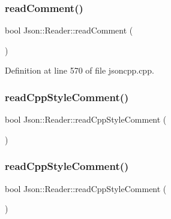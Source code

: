 \hypertarget{class_json_1_1_reader_ad2690e860a1b3332c5401fb0850ba065}{}\label{class_json_1_1_reader_ad2690e860a1b3332c5401fb0850ba065} 
\subsubsection{\texorpdfstring{read\+Comment()}{readComment()}\hspace{0.1cm}{\footnotesize\ttfamily [2/2]}}
{\footnotesize\ttfamily bool Json\+::\+Reader\+::read\+Comment (\begin{DoxyParamCaption}{ }\end{DoxyParamCaption})\hspace{0.3cm}{\ttfamily [private]}}



Definition at line 570 of file jsoncpp.\+cpp.

\hypertarget{class_json_1_1_reader_a6716ef6290b0f469efaf8d379c357967}{}\label{class_json_1_1_reader_a6716ef6290b0f469efaf8d379c357967} 
\subsubsection{\texorpdfstring{read\+Cpp\+Style\+Comment()}{readCppStyleComment()}\hspace{0.1cm}{\footnotesize\ttfamily [1/2]}}
{\footnotesize\ttfamily bool Json\+::\+Reader\+::read\+Cpp\+Style\+Comment (\begin{DoxyParamCaption}{ }\end{DoxyParamCaption})\hspace{0.3cm}{\ttfamily [private]}}

\hypertarget{class_json_1_1_reader_a6716ef6290b0f469efaf8d379c357967}{}\label{class_json_1_1_reader_a6716ef6290b0f469efaf8d379c357967} 
\subsubsection{\texorpdfstring{read\+Cpp\+Style\+Comment()}{readCppStyleComment()}\hspace{0.1cm}{\footnotesize\ttfamily [2/2]}}
{\footnotesize\ttfamily bool Json\+::\+Reader\+::read\+Cpp\+Style\+Comment (\begin{DoxyParamCaption}{ }\end{DoxyParamCaption})\hspace{0.3cm}{\ttfamily [private]}}




